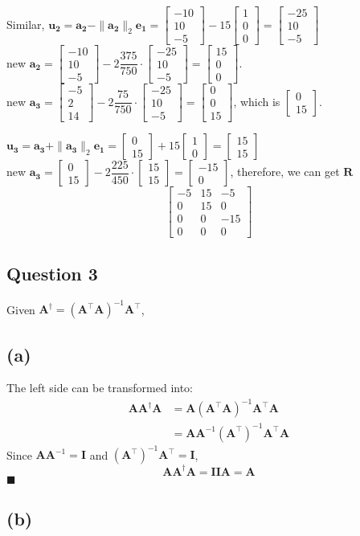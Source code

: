 \documentclass{article}
\newcommand{\bmat}[1]{\begin{bmatrix} #1 \end{bmatrix}}
\newcommand{\mat}[1]{\mathbf{#1}}
\begin{document}
Similar, $\mat{u_2} = \mat{a_2} - \|\mat{a_2}\|_2\mat{e_1} = \bmat{-10\\10\\-5} - 15\bmat{1\\0\\0} = \bmat{-25\\10\\-5}$\\
new $\mat{a_2} = \bmat{-10\\10\\-5} - 2\dfrac{375}{750}\cdot \bmat{-25\\10\\-5} = \bmat{15\\0\\0}$.\\
new $\mat{a_3} = \bmat{-5\\2\\14} - 2\dfrac{75}{750}\cdot \bmat{-25\\10\\-5} = \bmat{0\\0\\15}$, which is $\bmat{0\\15}$.

$\mat{u_3} = \mat{a_3} + \|\mat{a_3}\|_2\mat{e_1} =\bmat{0\\15} + 15\bmat{1\\0} = \bmat{15\\15}$\\
new $\mat{a_3} = \bmat{0\\15} - 2\dfrac{225}{450}\cdot \bmat{15\\15} = \bmat{-15\\0}$, therefore, we can get $\mat{R}$
$$\begin{bmatrix}
    -5 & 15 & -5 \\
    0 & 15 & 0 \\
    0 & 0 & -15\\
    0 & 0 & 0
\end{bmatrix}$$


\subsection*{Question 3}
Given $\mat{A}^\dagger = (\mat{A}^\top \mat{A})^{-1}\mat{A}^\top$,

\subsection*{(a)}
The left side can be transformed into:
\begin{align}
    \mat{A}\mat{A}^\dagger\mat{A} &= \mat{A}  (\mat{A}^\top \mat{A})^{-1}\mat{A}^\top \mat{A}\nonumber \\
    &= \mat{A}\mat{A}^{-1}(\mat{A}^\top)^{-1}\mat{A}^\top \mat{A} \nonumber
\end{align}
Since $\mat{A}\mat{A}^{-1} = \mat{I}$ and $(\mat{A}^\top)^{-1}\mat{A}^\top = \mat{I}$,
$$\mat{A}\mat{A}^\dagger\mat{A} = \mat{I}\mat{I}\mat{A} = \mat{A}$$
$\blacksquare$

\subsection*{(b)}
\end{document}

